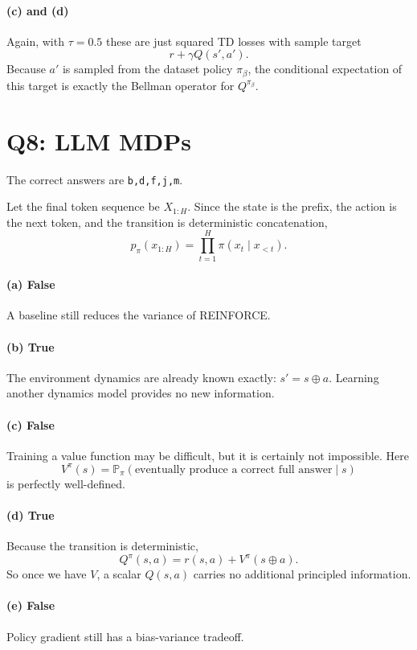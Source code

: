\documentclass[11pt]{article}
\newcommand{\Prb}{\mathbb{P}}
\newcommand{\1}{\mathbf{1}}
\begin{document}
\paragraph{(c) and (d)}
Again, with $\tau=0.5$ these are just squared TD losses with sample target
\[
r+\gamma Q(s',a').
\]
Because $a'$ is sampled from the dataset policy $\pi_\beta$, the conditional expectation of this target is exactly the Bellman operator for $Q^{\pi_\beta}$.

\section{Q8: LLM MDPs}
The correct answers are \texttt{b,d,f,j,m}.

Let the final token sequence be $X_{1:H}$. Since the state is the prefix, the action is the next token, and the transition is deterministic concatenation,
\[
p_\pi(x_{1:H})=\prod_{t=1}^H \pi(x_t\mid x_{<t}).
\]

\paragraph{(a) False}
A baseline still reduces the variance of REINFORCE.

\paragraph{(b) True}
The environment dynamics are already known exactly: $s'=s\oplus a$. Learning another dynamics model provides no new information.

\paragraph{(c) False}
Training a value function may be difficult, but it is certainly not impossible. Here
\[
V^\pi(s)=\Prb_\pi(\text{eventually produce a correct full answer}\mid s)
\]
is perfectly well-defined.

\paragraph{(d) True}
Because the transition is deterministic,
\[
Q^\pi(s,a)=r(s,a)+V^\pi(s\oplus a).
\]
So once we have $V$, a scalar $Q(s,a)$ carries no additional principled information.

\paragraph{(e) False}
Policy gradient still has a bias-variance tradeoff.
\end{document}
